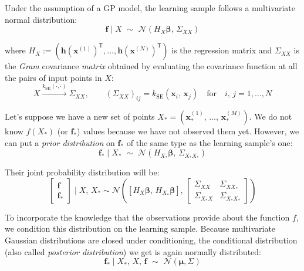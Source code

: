\vspace{0.2cm}
Under the assumption of a GP model, the learning sample follows a multivariate normal distribution:
\begin{equation}
    \mathbf{f}\;\vert\; X \,\,\sim\,\, \mathcal{N}(H_{X}\boldsymbol{\beta},\,\Sigma_{XX})
\end{equation}

\noindent
where $H_{X}:=(\mathbf{h}(\mathbf{x}^{(1)})^\mathsf{T},\dots,\mathbf{h}(\mathbf{x}^{(N)})^\mathsf{T})$ is the regression matrix and $\Sigma_{XX}$ is the \textit{Gram} covariance \textit{matrix} obtained by evaluating the covariance function at all the pairs of input points in $X$:
\begin{equation}
    X\xrightarrow{k_{\text{SE}}(\cdot,\cdot)}\Sigma_{XX},\qquad \left(\Sigma_{XX}\right)_{ij} = k_{\text{SE}}(\mathbf{x}_i,\,\mathbf{x}_j)\quad\text{for}\quad i,\,j=1,\dots,N
\end{equation}

\noindent
Let's suppose we have a new set of points $X_{*}=(\mathbf{x}_{*}^{(1)},\,\dots,\,\mathbf{x}_{*}^{(M)})$. We do not know $f(X_{*})$ (or $\mathbf{f}_{*}$) values because we have not observed them yet. However, we can put a \textit{prior distribution} on $\mathbf{f}_{*}$ of the same type as the learning sample's one:
\begin{equation}
    \mathbf{f}_{*}\;\vert\; X_{*} \,\,\sim\,\, \mathcal{N}(H_{X_{*}}\boldsymbol{\beta},\,\Sigma_{X_{*}X_{*}})
\end{equation}

\noindent
Their joint probability distribution will be:
\begin{equation}
    \begin{bmatrix}
    \mathbf{f} \\ \mathbf{f}_{*}
    \end{bmatrix}\;\vert\; X,\,X_{*} \sim \mathcal{N}\left([H_{X}\boldsymbol{\beta},\,H_{X_{*}}\boldsymbol{\beta}],\,\begin{bmatrix}
    \Sigma_{XX} & \Sigma_{XX_{*}} \\
    \Sigma_{X_{*}X} & \Sigma_{X_{*}X_{*}}
    \end{bmatrix}
    \right)
\end{equation}

\noindent
To incorporate the knowledge that the observations provide about the function $f$, we condition this distribution on the learning sample. Because multivariate Gaussian distributions are closed under conditioning, the conditional distribution (also called \textit{posterior distribution}) we get is again normally distributed:
%
\begin{equation}\label{eq:gpepostdistrnonoise}
    \mathbf{f}_{*}\;\vert\; X_{*},\,X,\,\mathbf{f}\,\,\sim\,\,\mathcal{N}(\boldsymbol{\mu},\Sigma)
\end{equation}
    
